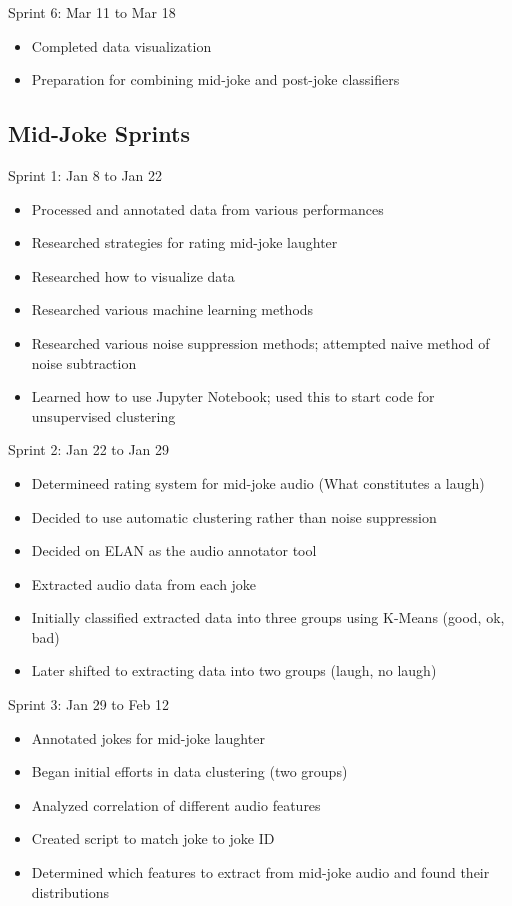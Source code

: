 \documentclass[onecolumn, draftclsnofoot,10pt, compsoc]{IEEEtran}
\begin{document}
Sprint 6: Mar 11 to Mar 18
\begin{itemize}
\item Completed data visualization
\item Preparation for combining mid-joke and post-joke classifiers
\end{itemize}

\subsection{Mid-Joke Sprints}

Sprint 1: Jan 8 to Jan 22
\begin{itemize}
\item Processed and annotated data from various performances
\item Researched strategies for rating mid-joke laughter
\item Researched how to visualize data
\item Researched various machine learning methods
\item Researched various noise suppression methods; attempted naive method of noise subtraction
\item Learned how to use Jupyter Notebook; used this to start code for unsupervised clustering
\end{itemize}

Sprint 2: Jan 22 to Jan 29
\begin{itemize}
\item Determineed rating system for mid-joke audio (What constitutes a laugh)
\item Decided to use automatic clustering rather than noise suppression
\item Decided on ELAN as the audio annotator tool
\item Extracted audio data from each joke
\item Initially classified extracted data into three groups using K-Means (good, ok, bad)
\item Later shifted to extracting data into two groups (laugh, no laugh)
\end{itemize}

Sprint 3: Jan 29 to Feb 12
\begin{itemize}
\item Annotated jokes for mid-joke laughter
\item Began initial efforts in data clustering (two groups)
\item Analyzed correlation of different audio features
\item Created script to match joke to joke ID
\item Determined which features to extract from mid-joke audio and found their distributions
\end{itemize}
\end{document}
